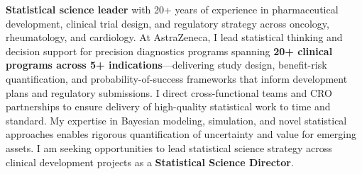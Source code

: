 
\textbf{Statistical science leader} with 20+ years of experience in pharmaceutical development, clinical trial design, and regulatory strategy across oncology, rheumatology, and cardiology. At AstraZeneca, I lead statistical thinking and decision support for precision diagnostics programs spanning \textbf{20+ clinical programs across 5+ indications}---delivering study design, benefit-risk quantification, and probability-of-success frameworks that inform development plans and regulatory submissions. I direct cross-functional teams and CRO partnerships to ensure delivery of high-quality statistical work to time and standard. My expertise in Bayesian modeling, simulation, and novel statistical approaches enables rigorous quantification of uncertainty and value for emerging assets. I am seeking opportunities to lead statistical science strategy across clinical development projects as a \textbf{Statistical Science Director}.

